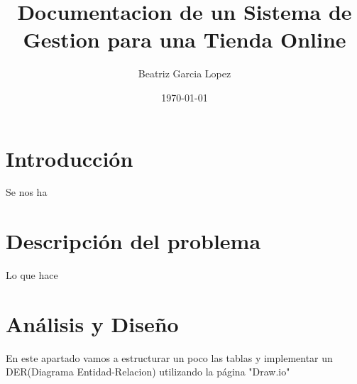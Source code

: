 \documentclass[10pt,letterpaper]{article}
\title{Documentacion de un Sistema de Gestion para una Tienda Online}
\author{Beatriz Garcia Lopez }
\date{\today}
\begin{document}
\maketitle




\section{Introducción}
Se nos ha 
\section{Descripción del problema}
Lo que hace 
\section{Análisis y Diseño}
En este apartado vamos a estructurar un poco las tablas y implementar un DER(Diagrama Entidad-Relacion) utilizando la página "Draw.io"
\end{document}

